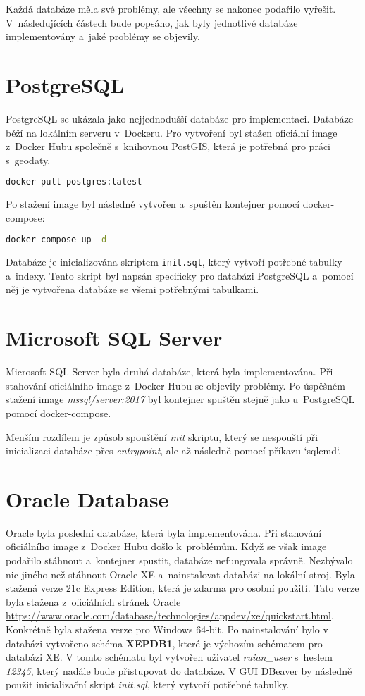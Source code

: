 Každá databáze měla své problémy, ale všechny se nakonec podařilo vyřešit.
V~následujících částech bude popsáno, jak byly jednotlivé databáze implementovány a~jaké problémy se objevily.

\section{PostgreSQL}
PostgreSQL se ukázala jako nejjednodušší databáze pro implementaci.  
Databáze běží na lokálním serveru v~Dockeru.  
Pro vytvoření byl stažen oficiální image z~Docker Hubu  
společně s~knihovnou PostGIS, která je potřebná pro práci s~geodaty.

\begin{lstlisting}[language=bash]
docker pull postgres:latest
\end{lstlisting}

Po stažení image byl následně vytvořen a~spuštěn kontejner pomocí docker-compose:

\begin{lstlisting}[language=bash]
docker-compose up -d
\end{lstlisting}

Databáze je inicializována skriptem \texttt{init.sql}, který vytvoří potřebné tabulky a~indexy.  
Tento skript byl napsán specificky pro databázi PostgreSQL a~pomocí něj je vytvořena databáze  
se všemi potřebnými tabulkami.

\section{Microsoft SQL Server}
Microsoft SQL Server byla druhá databáze, která byla implementována.  
Při stahování oficiálního image z~Docker Hubu se objevily problémy.  
Po úspěšném stažení image \textit{mssql/server:2017} byl kontejner spuštěn stejně jako u~PostgreSQL  
pomocí docker-compose.

Menším rozdílem je způsob spouštění \textit{init} skriptu, který se nespouští při inicializaci databáze  
přes \textit{entrypoint}, ale až následně pomocí příkazu `sqlcmd`.

\newpage

\section{Oracle Database}
Oracle byla poslední databáze, která byla implementována.  
Při stahování oficiálního image z~Docker Hubu došlo k~problémům.  
Když se však image podařilo stáhnout a~kontejner spustit, databáze nefungovala správně.  
Nezbývalo nic jiného než stáhnout Oracle XE a~nainstalovat databázi na lokální stroj.  
Byla stažená verze 21c Express Edition, která je zdarma pro osobní použití.
Tato verze byla stažena z~oficiálních stránek Oracle 
\url{https://www.oracle.com/database/technologies/appdev/xe/quickstart.html}.
Konkrétně byla stažena verze pro Windows 64-bit.
Po nainstalování bylo v databázi vytvořeno schéma \textbf{XEPDB1}, které je výchozím 
schématem pro databázi XE. V tomto schématu byl vytvořen uživatel \textit{ruian\_user} s~heslem \textit{12345},
který nadále bude přistupovat do databáze.
V GUI DBeaver by následně použit inicializační skript \textit{init.sql}, 
který vytvoří potřebné tabulky.


